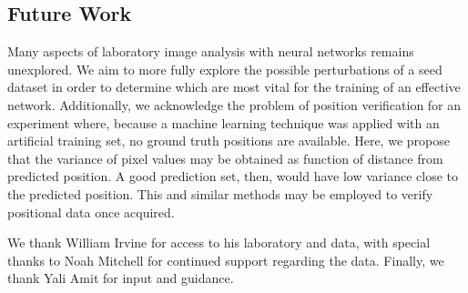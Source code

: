 \documentclass[twocolumn, 10pt]{asme2ej}
\begin{document}
\subsection{Future Work}
\label{sec:future-work}

Many aspects of laboratory image analysis with neural networks remains
unexplored. We aim to more fully explore the possible perturbations of a seed
dataset in order to determine which are most vital for the training of an
effective network. Additionally, we acknowledge the problem of position
verification for an experiment where, because a machine learning technique was
applied with an artificial training set, no ground truth positions are
available. Here, we propose that the variance of pixel values may be obtained as
function of distance from predicted position. A good prediction set, then, would
have low variance close to the predicted position. This and similar methods may
be employed to verify positional data once acquired.

\begin{acknowledgment}
  We thank William Irvine for access to his laboratory and data, with special
  thanks to Noah Mitchell for continued support regarding the data. Finally, we
  thank Yali Amit for input and guidance.
\end{acknowledgment}



\end{document}
